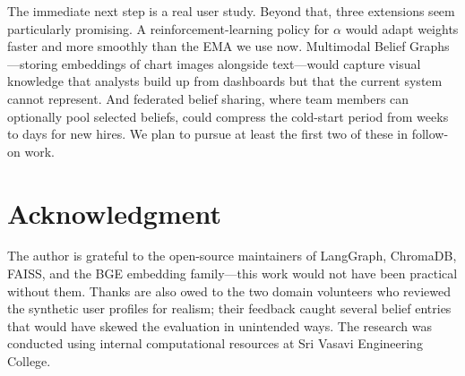 \documentclass[conference]{IEEEtran}
\begin{document}
The immediate next step is a real user study. Beyond that, three
extensions seem particularly promising. A reinforcement-learning
policy for $\alpha$ would adapt weights faster and more smoothly than
the EMA we use now. Multimodal Belief Graphs---storing embeddings of
chart images alongside text---would capture visual knowledge that
analysts build up from dashboards but that the current system cannot
represent. And federated belief sharing, where team members can
optionally pool selected beliefs, could compress the cold-start
period from weeks to days for new hires. We plan to pursue at least
the first two of these in follow-on work.

\section*{Acknowledgment}

The author is grateful to the open-source maintainers of LangGraph,
ChromaDB, FAISS, and the BGE embedding family---this work would not
have been practical without them. Thanks are also owed to the
two domain volunteers who reviewed the synthetic user profiles for
realism; their feedback caught several belief entries that would
have skewed the evaluation in unintended ways. The research was
conducted using internal computational resources at Sri Vasavi
Engineering College.
\end{document}
